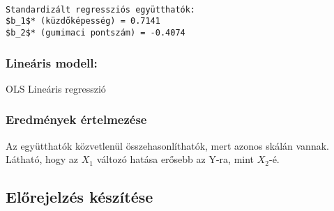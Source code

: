\documentclass[11pt]{article}
\begin{document}
    \begin{Verbatim}[commandchars=\\\{\}]

Standardizált regressziós együtthatók:
$b_1$* (küzdőképesség) = 0.7141
$b_2$* (gumimaci pontszám) = -0.4074
    \end{Verbatim}

    \subsubsection{Lineáris modell:}\label{lineuxe1ris-modell}

OLS Lineáris regresszió

\subsubsection{Eredmények
értelmezése}\label{eredmuxe9nyek-uxe9rtelmezuxe9se}

Az együtthatók közvetlenül összehasonlíthatók, mert azonos skálán
vannak.\\
Látható, hogy az $X_1$ változó hatása erősebb az Y-ra, mint $X_2$-é.

    \subsection{Előrejelzés
készítése}\label{elux151rejelzuxe9s-kuxe9szuxedtuxe9se}
\end{document}
